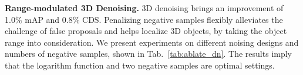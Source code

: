\documentclass[letterpaper]{article} \usepackage{aaai24}
\begin{document}
\begin{table}[t]
    \centering
    \caption{Performance Comparison of negative denoising samples with different designs and numbers.}
    \vspace{-0.2cm}
    \label{tab:ablate_dn}
    \tiny
    \vspace{-0.3cm}
\end{table} \noindent\textbf{Range-modulated 3D Denoising.} 3D denoising brings an improvement of 1.0\% mAP and 0.8\% CDS. Penalizing negative samples flexibly alleviates the challenge of false proposals and helps localize 3D objects, by taking the object range into consideration.  
We present experiments on different noising designs and numbers of negative samples, shown in Tab.~\ref{tab:ablate_dn}. The results imply that the logarithm function and two negative samples are optimal settings.
\end{document}
